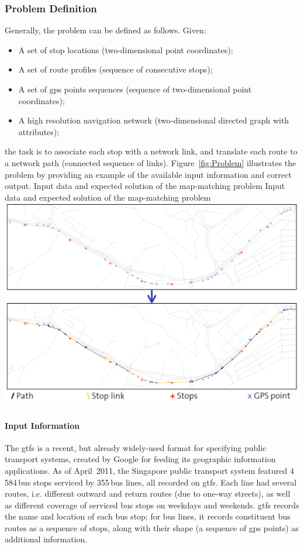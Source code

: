 \subsubsection{Problem Definition}
Generally, the problem can be defined as follows. Given:
%
\begin{itemize}\styleItemize
\item A set of stop locations (two-dimensional point coordinates);
\item A set of route profiles (sequence of consecutive stops);
\item A set of \gls{gps} points sequences (sequence of two-dimensional point coordinates);
\item A high resolution navigation network (two-dimensional directed graph with attributes);
\end{itemize}
%
the task is to associate each stop with a network link, and translate each route to a network path (connected sequence of links). Figure~\ref{fig:Problem} illustrates the problem by providing an example of the available input information and correct output.
%
\createfigure
{Input data and expected solution of the map-matching problem}
{Input data and expected solution of the map-matching problem}
{\label{fig:Problem}}
{\includegraphics[width=1.0\textwidth]{extending/figures/semiAuto/Problem.png}}
{}

\paragraph{Input Information}

The \gls{gtfs} is a recent, but already widely-used format for specifying public transport systems, created by Google for feeding its geographic information applications. As of April~2011, the Singapore public transport system featured 4\,584\,bus stops serviced by 355\,bus lines, all recorded on \gls{gtfs}. Each line had several routes, i.e. different outward and return routes (due to one-way streets), as well as different coverage of serviced bus stops on weekdays and weekends. \gls{gtfs} records the name and location of each bus stop; for bus lines, it records constituent bus routes as a sequence of stops, along with their shape (a sequence of \gls{gps} points) as additional information. 

